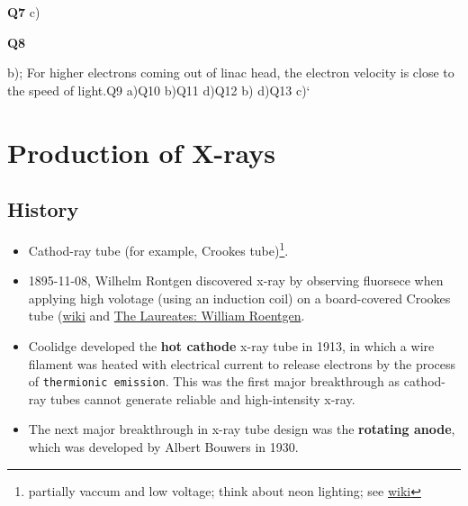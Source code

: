 \documentclass[]{book}
\providecommand{\tightlist}{%
  \setlength{\itemsep}{0pt}\setlength{\parskip}{0pt}}
\let\rmarkdownfootnote\footnote%
\def\footnote{\protect\rmarkdownfootnote}
\theoremstyle{definition}
\theoremstyle{definition}
\theoremstyle{definition}
\theoremstyle{remark}
\begin{document}
\textbf{Q7} c)

\textbf{Q8}

b); For higher electrons coming out of linac head, the electron velocity
is close to the speed of light.\texttt{}Q9 a)\texttt{}Q10 b)\texttt{}Q11
d)\texttt{}Q12 b) d)\texttt{}Q13 c)`

\chapter{Production of X-rays}\label{prox}

\section{History}\label{history}

\begin{itemize}
\tightlist
\item
  Cathod-ray tube (for example, Crookes tube)\footnote{partially vaccum
    and low voltage; think about neon lighting; see
    \href{https://en.wikipedia.org/wiki/Crookes_tube}{wiki}}.
\item
  1895-11-08, Wilhelm Rontgen discovered x-ray by observing fluorsece
  when applying high volotage (using an induction coil) on a
  board-covered Crookes tube
  (\href{https://en.wikipedia.org/wiki/Wilhelm_Röntgen}{wiki} and
  \href{https://www.youtube.com/watch?v=qVn3mgt8Two}{The Laureates:
  William Roentgen}.
\item
  Coolidge developed the \textbf{hot cathode} x-ray tube in 1913, in
  which a wire filament was heated with electrical current to release
  electrons by the process of \texttt{thermionic\ emission}. This was
  the first major breakthrough as cathod-ray tubes cannot generate
  reliable and high-intensity x-ray.
\item
  The next major breakthrough in x-ray tube design was the
  \textbf{rotating anode}, which was developed by Albert Bouwers in
  1930.
\end{itemize}
\end{document}

